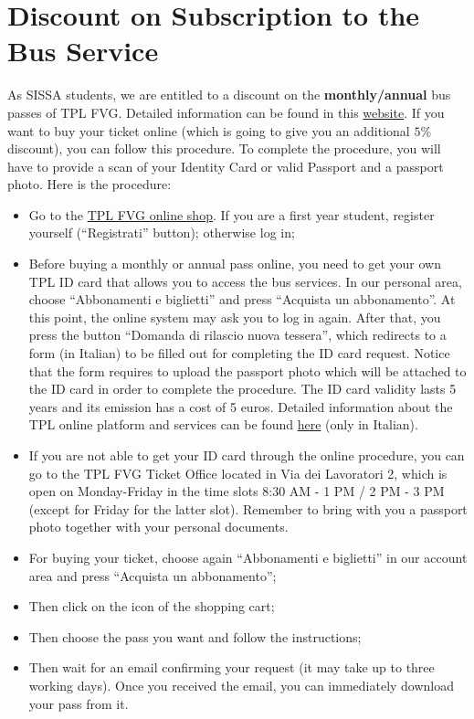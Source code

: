 \documentclass{sissavademecum}
\begin{document}
\section{Discount on Subscription to the Bus Service}

As SISSA students, we are entitled to a discount on the \textbf{monthly/annual} bus passes of TPL FVG. Detailed information can be found in this \href{http://ardiss.fvg.it/contenuti.php?view=page&id=41#scheda67}{website}. If you want to buy your ticket online (which is going to give you an additional $5$\% discount), you can follow this procedure. To complete the procedure, you will have to provide a scan of your Identity Card or valid Passport and a passport photo. Here is the procedure:
\begin{itemize}
    \item Go to the \href{https://tplfvg.it/it/passenger/}{TPL FVG online shop}. If you are a first year student, register yourself (``Registrati'' button); otherwise log in;
    \item Before buying a monthly or annual pass online, you need to get your own TPL ID card that allows you to access the bus services. In our personal area, choose ``Abbonamenti e biglietti'' and press ``Acquista un abbonamento''. At this point, the online system may ask you to log in again. After that, you press the button ``Domanda di rilascio nuova tessera'', which redirects to a form (in Italian) to be filled out for completing the ID card request. Notice that the form requires to upload the passport photo which will be attached to the ID card in order to complete the procedure. The ID card validity lasts 5 years and its emission has a cost of 5 euros. Detailed information about the TPL online platform and services
    can be found \href{https://webticketing.triestetrasporti.it/Documenti/Istruzioni.pdf}{here} (only in Italian).
    \item If you are not able to get your ID card through the online procedure, you can go to the TPL FVG Ticket Office located in Via dei Lavoratori 2, which is open on Monday-Friday in the time slots 8:30 AM - 1 PM / 2 PM - 3 PM (except for Friday for the latter slot). Remember to bring with you a passport photo together with your personal documents.
    \item For buying your ticket, choose again ``Abbonamenti e biglietti'' in our account area and press ``Acquista un abbonamento'';
    \item Then click on the icon of the shopping cart;
    \item Then choose the pass you want and follow the instructions;
    \item Then wait for an email confirming your request (it may take up to three working days). Once you received the email, you can immediately download your pass from it.
\end{itemize}
\end{document}
